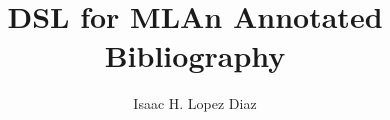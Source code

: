 \documentclass{article}
\title{DSL for ML\@ An Annotated Bibliography}
\author{Isaac H. Lopez Diaz}
\begin{document}
\maketitle
\nocite{*}


\end{document}
